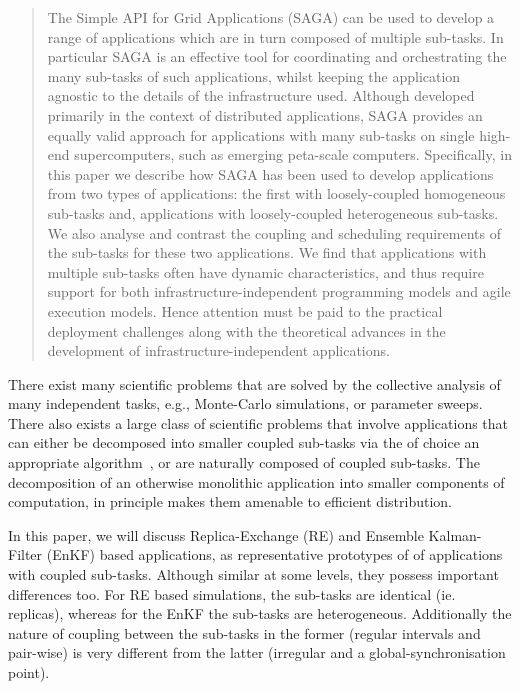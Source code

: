 \documentclass{llncs}
\begin{document}
\begin{abstract}
  The Simple API for Grid Applications (SAGA) can be used to develop a
  range of applications which are in turn composed of multiple
  sub-tasks.
  In particular SAGA is an effective tool for coordinating and
  orchestrating the many sub-tasks of such applications, whilst
  keeping the application agnostic to the details of the
  infrastructure used. Although developed primarily in the context of
  distributed applications, SAGA provides an equally valid approach
  for applications with many sub-tasks on single high-end
  supercomputers, such as emerging peta-scale computers.
  Specifically, in this paper we describe how SAGA has been used to
  develop applications from two types of applications: the first with
  loosely-coupled homogeneous sub-tasks and, applications with
  loosely-coupled heterogeneous sub-tasks. We also analyse and
  contrast the coupling and scheduling requirements of the sub-tasks
  for these two applications.  We find that applications with multiple
  sub-tasks often have dynamic characteristics, and thus require
  support for both infrastructure-independent programming models and
  agile execution models. Hence attention must be paid to the
  practical deployment challenges along with the theoretical advances
  in the development of infrastructure-independent applications.
\end{abstract}

There exist many scientific problems that are solved by the collective
analysis of many independent tasks, e.g., Monte-Carlo simulations, or
parameter sweeps.  There also exists a large class of scientific
problems that involve applications that can either be decomposed into
smaller coupled sub-tasks via the of choice an appropriate
algorithm~\cite{spice_sc05}, or are naturally composed of coupled
sub-tasks. The decomposition of an otherwise monolithic application
into smaller components of computation, in principle makes them
amenable to efficient distribution. 

In this paper, we will discuss Replica-Exchange (RE) and Ensemble
Kalman-Filter (EnKF) based applications, as representative prototypes
of of applications with coupled sub-tasks.  Although similar at some
levels, they possess important differences too.  For RE based
simulations, the sub-tasks are identical (ie. replicas), whereas for
the EnKF the sub-tasks are heterogeneous. Additionally the nature of
coupling between the sub-tasks in the former (regular intervals and
pair-wise) is very different from the latter (irregular and a
global-synchronisation point).
\end{document}

